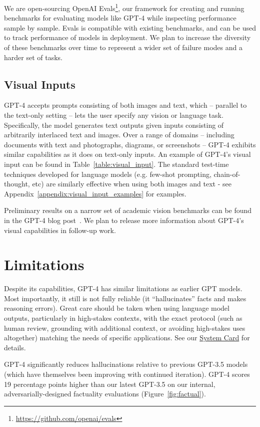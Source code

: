 We are open-sourcing OpenAI Evals\footnote{\href{https://github.com/openai/evals}{https://github.com/openai/evals}}, our framework for creating and running benchmarks for evaluating models like GPT-4 while inspecting performance sample by sample. Evals is compatible with existing benchmarks, and can be used to track performance of models in deployment. We plan to increase the diversity of these benchmarks over time to represent a wider set of failure modes and a harder set of tasks.

\subsection{Visual Inputs}

GPT-4 accepts prompts consisting of both images and text, which -- parallel to the text-only setting -- lets the user specify any vision or language task. Specifically, the model generates text outputs given inputs consisting of arbitrarily interlaced text and images. Over a range of domains -- including documents with text and photographs, diagrams, or screenshots -- GPT-4 exhibits similar capabilities as it does on text-only inputs. An example of GPT-4's visual input can be found in Table~\ref{table:visual_input}. The standard test-time techniques developed for language models (e.g. few-shot prompting, chain-of-thought, etc) are similarly effective when using both images and text - see Appendix~\ref{appendix:visual_input_examples} for examples.

Preliminary results on a narrow set of academic vision benchmarks can be found in the GPT-4 blog post~\cite{openaigpt4blog}. We plan to release more information about GPT-4's visual capabilities in follow-up work.

\section{Limitations}

Despite its capabilities, GPT-4 has similar limitations as earlier GPT models. Most importantly, it still is not fully reliable (it ``hallucinates'' facts and makes reasoning errors). Great care should be taken when using language model outputs, particularly in high-stakes contexts, with the exact protocol (such as human review, grounding with additional context, or avoiding high-stakes uses altogether) matching the needs of specific applications. See our \hyperref[systemcard]{System Card} for details.

GPT-4 significantly reduces hallucinations relative to previous GPT-3.5 models (which have themselves been improving with continued iteration). GPT-4 scores 19 percentage points higher than our latest GPT-3.5 on our internal, adversarially-designed factuality evaluations (Figure~\ref{fig:factual}).

